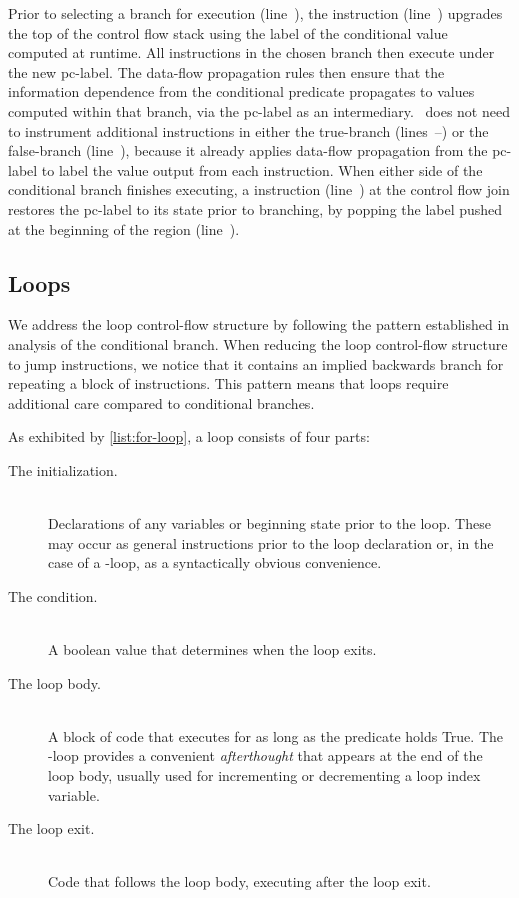 Prior to selecting a branch for execution (line~), the \join instruction (line~) upgrades the top of the control flow stack using the label of the conditional value computed at runtime.
All instructions in the chosen branch then execute under the new pc-label.
The data-flow propagation rules then ensure that the information dependence from the conditional predicate propagates to values computed within that branch, via the pc-label as an intermediary.
\FlowCore\ does not need to instrument additional instructions in either the true-branch (lines~--) or the false-branch (line~), because it already applies data-flow propagation from the pc-label to label the value output from each instruction.
When either side of the conditional branch finishes executing, a \popj instruction (line~) at the control flow join restores the pc-label to its state prior to branching, by popping the label pushed at the beginning of the region (line~).

\subsection{Loops}

We address the loop control-flow structure by following the pattern established in analysis of the conditional branch.
When reducing the loop control-flow structure to jump instructions, we notice that it contains an implied backwards branch for repeating a block of instructions.
This pattern means that loops require additional care compared to conditional branches.

As exhibited by \autoref{list:for-loop}, a loop consists of four parts:
\begin{description}
  \item [The initialization.] \hfill \\
    Declarations of any variables or beginning state prior to the loop.
    These may occur as general instructions prior to the loop declaration or, in the case of a -loop, as a syntactically obvious convenience.
  \item [The condition.] \hfill \\
    A boolean value that determines when the loop exits.
  \item [The loop body.] \hfill \\
    A block of code that executes for as long as the predicate holds True.
    The -loop provides a convenient \emph{afterthought} that appears at the end of the loop body, usually used for incrementing or decrementing a loop index variable.
  \item [The loop exit.] \hfill \\
    Code that follows the loop body, executing after the loop exit.
\end{description}

